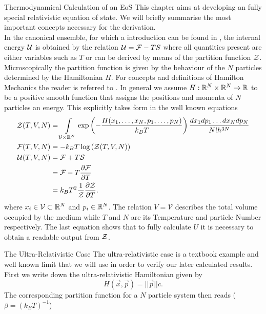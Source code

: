 \begin{section}{Thermodynamical Calculation of an EoS}
This chapter aims at developing an fully special relativistic equation of state. We will briefly summarise the most important concepts necessary for the derivation.\\
In the canonical ensemble, for which a introduction can be found in \cite{fliessbachStatistischePhysikLehrbuch2018}, the internal energy $\mathcal{U}$ is obtained by the relation $\mathcal{U}=\mathcal{F}-TS$ where all quantities present are either variables such as $T$ or can be derived by means of the partition function $\mathcal{Z}$.
Microscopically the partition function is given by the behaviour of the $N$ particles determined by the Hamiltonian $H$. 
For concepts and definitions of Hamilton Mechanics the reader is referred to \cite{eschrigTopologyGeometryPhysics2011, fliessbachMechanikLehrbuchZur2020, spivakPhysicsMathematiciansMechanics2010}. 
In general we assume $H:\mathbb{R}^N\times\mathbb{R}^N\rightarrow\mathbb{R}$ to be a positive smooth function that assigns the positions and momenta of $N$ particles an energy.
This explicitly takes form in the well known equations
\begin{align}
	\mathcal{Z}(T,V,N) 	&= \int\limits_{\mathcal{V}\times\mathbb{R}^N}\exp\left(-\frac{H(x_1,\dots,x_N,p_1,\dots,p_N)}{k_BT}\right)\frac{dx_1dp_1\dots dx_Ndp_N}{N!h^{3N}}\\
	\mathcal{F}(T,V,N) 	&= - k_BT\log\left(\mathcal{Z}(T,V,N)\right)\label{2-IntEner-FreeEnerDef}\\
	\mathcal{U}(T,V,N) 	&= \mathcal{F} + T \mathcal{S}\\
				&= \mathcal{F} - T\frac{\partial\mathcal{F}}{\partial T}\\
				&= k_BT^2\frac{1}{\mathcal{Z}}\frac{\partial\mathcal{Z}}{\partial T}\label{2-IntEner-Def}.
\end{align}
where $x_i\in \mathcal{V}\subset\mathbb{R}^N$  and $p_i\in \mathbb{R}^N$. The relation $V=\mathcal{V}$ describes the total volume occupied by the medium while $T$ and $N$ are its Temperature and particle Number respectively. 
The last equation shows that to fully calculate $U$ it is necessary to obtain a readable output from $\mathcal{Z}$.
\begin{subsection}{The Ultra-Relativistic Case}
The ultra-relativistic case is a textbook example and well known limit that we will use in order to verify our later calculated results. 
First we write down the ultra-relativistic Hamiltonian given by 
\begin{equation}
	H(\vec{x},\vec{p})=||\vec{p}||c.
\end{equation}
The corresponding partition function for a $N$ particle system then reads ($\beta=(k_BT)^{-1}$)

\end{subsection}
\end{section}
